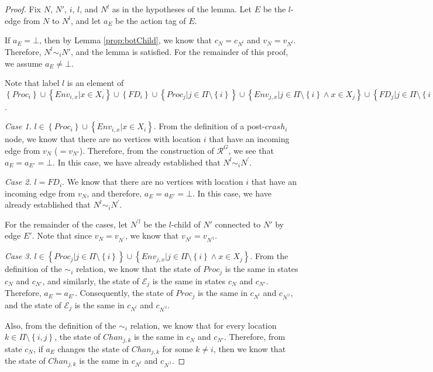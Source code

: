 \documentclass[11pt]{article}
\numberwithin{theorem}{section}
\newcommand{\set}[1]{\left\{#1\right\}}
\begin{document}
\begin{proof}
 Fix $N$, $N'$, $i$, $l$, and $N^l$ as in the hypotheses of the lemma. Let $E$ be the $l$-edge from $N$ to $N^l$, and let $a_E$ be the action tag of $E$. 
 
 If $a_E = \bot$, then by Lemma \ref{prop:botChild}, we know that $c_N = c_{N^l}$ and $v_N = v_{N^l}$. Therefore, $N^l \sim_i N'$, and the lemma is satisfied. For the remainder of this proof, we assume $a_E \neq \bot$.
 
 Note that label $l$ is an element of $\set{Proc_i} \cup \set{Env_{i,x} | x \in X_i}  \cup \set{FD_i} \cup  \set{Proc_j | j \in \Pi \setminus \set{i}} \cup \set{Env_{j,x} | j \in \Pi \setminus \set{i} \wedge x \in X_j} \cup \set{FD_j | j \in \Pi \setminus \set{i}} \cup \set{Chan_{j,k} | j \in \Pi \wedge k \in \Pi \setminus \set{j}}$.
  
  \emph{Case 1.} $l \in \set{Proc_i} \cup \set{Env_{i,x} | x \in X_i}$. From the definition of a post-$crash_i$ node, we know that there are no vertices with location $i$ that have an incoming edge from $v_N$ ($=v_{N'}$). Therefore, from the construction of $\mathcal{R}^G$, we see that $a_E = a_{E'} = \bot$. In this case, we have already established that $N^l \sim_i N^\prime$.
  
  \emph{Case 2.} $l = FD_i$. We know that there are no vertices with location $i$ that have an incoming edge from $v_N$, and therefore, $a_E = a_{E'} = \bot$. In this case, we have already established that $N^l \sim_i N^\prime$.
  
For the remainder of the cases, let $N^{\prime l}$ be the $l$-child of $N'$ connected to $N'$ by edge $E'$. Note that since $v_N = v_{N^\prime}$, we know that $v_{N^l} = v_{N^{\prime l}}$.  


  
 \emph{Case 3.} $l  \in \set{Proc_j | j \in \Pi \setminus \set{i}}  \cup \set{Env_{j,x} | j \in \Pi \setminus \set{i} \wedge x \in X_j}$. From the definition of the $\sim_i$ relation, we know that the state of $Proc_j$  is the same in states $c_N$ and $c_{N'}$, and similarly, the state of $\mathcal{E}_j$ is the same in states $c_N$ and $c_{N'}$. Therefore, $a_E = a_{E'}$. Consequently, the state of $Proc_j$  is the same in $c_{N^l}$ and $c_{N^{\prime l}}$, and the state of $\mathcal{E}_j$ is the same in $c_{N^l}$ and $c_{N^{\prime l}}$. 
 
 Also, from the definition of the $\sim_i$ relation, we know that for every location $k \in \Pi \setminus \set{i,j}$, the state of $Chan_{j,k}$ is the same in $c_N$ and $c_{N'}$. Therefore, from state $c_N$, if $a_E$ changes the state of $Chan_{j,k}$ for some $k \neq i$, then we know that the state of $Chan_{j,k}$ is the same in $c_{N^l}$ and $c_{N^{\prime l}}$. 
 

\end{proof}
\end{document}
